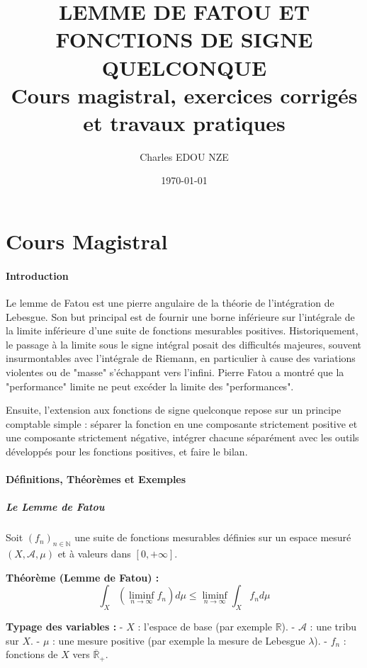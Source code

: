 \documentclass[11pt,a4paper]{article}
\title{\Huge LEMME DE FATOU ET FONCTIONS DE SIGNE QUELCONQUE \\ \large Cours magistral, exercices corrigés et travaux pratiques}
\author{\Large Charles EDOU NZE}
\date{\today}
\begin{document}
\maketitle
\tableofcontents
\newpage

\part{Cours Magistral}



\subsection{Introduction}

Le lemme de Fatou est une pierre angulaire de la théorie de l'intégration de Lebesgue. Son but principal est de fournir une borne inférieure sur l'intégrale de la limite inférieure d'une suite de fonctions mesurables positives. Historiquement, le passage à la limite sous le signe intégral posait des difficultés majeures, souvent insurmontables avec l'intégrale de Riemann, en particulier à cause des variations violentes ou de "masse" s'échappant vers l'infini. Pierre Fatou a montré que la "performance" limite ne peut excéder la limite des "performances".

Ensuite, l'extension aux fonctions de signe quelconque repose sur un principe comptable simple : séparer la fonction en une composante strictement positive et une composante strictement négative, intégrer chacune séparément avec les outils développés pour les fonctions positives, et faire le bilan.

\subsection{Définitions, Théorèmes et Exemples}

\subsubsection{Le Lemme de Fatou}

Soit $(f_n)_{n \in \mathbb{N}}$ une suite de fonctions mesurables définies sur un espace mesuré $(X, \mathcal{A}, \mu)$ et à valeurs dans $[0, +\infty]$.

\textbf{Théorème (Lemme de Fatou) :}
$$ \int_X \left( \liminf_{n \to \infty} f_n \right) d\mu \le \liminf_{n \to \infty} \int_X f_n d\mu $$

\textbf{Typage des variables :}
- $X$ : l'espace de base (par exemple $\mathbb{R}$).
- $\mathcal{A}$ : une tribu sur $X$.
- $\mu$ : une mesure positive (par exemple la mesure de Lebesgue $\lambda$).
- $f_n$ : fonctions de $X$ vers $\overline{\mathbb{R}}_+$.
\end{document}
